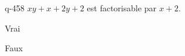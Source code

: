\begin{truefalse}{q-458}
$xy+x+2y+2$ est factorisable par $x+2$.
\item* Vrai
\item Faux
\end{truefalse}

